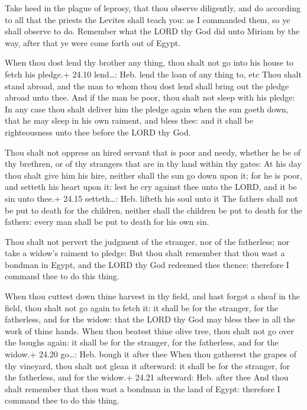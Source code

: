  Take heed in the plague of leprosy, that thou observe
diligently, and do according to all that the priests the Levites shall
teach you: as I commanded them, so ye shall observe to do. 
Remember what the LORD thy God did unto Miriam by the way, after that ye
were come forth out of Egypt.

 When thou dost lend thy brother any thing, thou shalt
not go into his house to fetch his pledge.+ 24.10 lend\ldots: Heb. lend
the loan of any thing to, etc  Thou shalt stand abroad, and
the man to whom thou dost lend shall bring out the pledge abroad unto
thee.  And if the man be poor, thou shalt not sleep with
his pledge:  In any case thou shalt deliver him the pledge
again when the sun goeth down, that he may sleep in his own raiment, and
bless thee: and it shall be righteousness unto thee before the LORD thy
God.

 Thou shalt not oppress an hired servant that is poor and
needy, whether he be of thy brethren, or of thy strangers that are in
thy land within thy gates:  At his day thou shalt give him
his hire, neither shall the sun go down upon it; for he is poor, and
setteth his heart upon it: lest he cry against thee unto the LORD, and
it be sin unto thee.+ 24.15 setteth\ldots: Heb. lifteth his soul unto it
 The fathers shall not be put to death for the children,
neither shall the children be put to death for the fathers: every man
shall be put to death for his own sin.

 Thou shalt not pervert the judgment of the stranger, nor
of the fatherless; nor take a widow's raiment to pledge: 
But thou shalt remember that thou wast a bondman in Egypt, and the LORD
thy God redeemed thee thence: therefore I command thee to do this thing.

 When thou cuttest down thine harvest in thy field, and
hast forgot a sheaf in the field, thou shalt not go again to fetch it:
it shall be for the stranger, for the fatherless, and for the widow:
that the LORD thy God may bless thee in all the work of thine hands.
 When thou beatest thine olive tree, thou shalt not go over
the boughs again: it shall be for the stranger, for the fatherless, and
for the widow.+ 24.20 go\ldots: Heb. bough it after thee 
When thou gatherest the grapes of thy vineyard, thou shalt not glean it
afterward: it shall be for the stranger, for the fatherless, and for the
widow.+ 24.21 afterward: Heb. after thee  And thou shalt
remember that thou wast a bondman in the land of Egypt: therefore I
command thee to do this thing.

